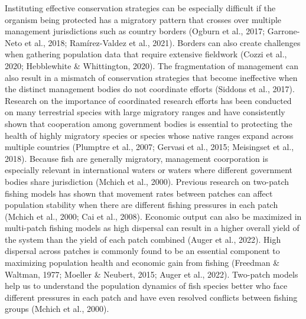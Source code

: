 \documentclass[
  12pt,
]{article}
\begin{document}
Instituting effective conservation strategies can be especially difficult if the organism being protected has a migratory pattern that crosses over multiple management jurisdictions such as country borders (Ogburn et al., 2017; Garrone-Neto et al., 2018; Ramírez-Valdez et al., 2021). Borders can also create challenges when gathering population data that require extensive fieldwork (Cozzi et al., 2020; Hebblewhite \& Whittington, 2020). The fragmentation of management can also result in a mismatch of conservation strategies that become ineffective when the distinct management bodies do not coordinate efforts (Siddons et al., 2017). Research on the importance of coordinated research efforts has been conducted on many terrestrial species with large migratory ranges and have consistently shown that cooperation among government bodies is essential to protecting the health of highly migratory species or species whose native ranges expand across multiple countries (Plumptre et al., 2007; Gervasi et al., 2015; Meisingset et al., 2018). Because fish are generally migratory, management coorporation is especially relevant in international waters or waters where different government bodies share jurisdiction (Mchich et al., 2000). Previous research on two-patch fishing models has shown that movement rates between patches can affect population stability when there are different fishing pressures in each patch (Mchich et al., 2000; Cai et al., 2008). Economic output can also be maximized in multi-patch fishing models as high dispersal can result in a higher overall yield of the system than the yield of each patch combined (Auger et al., 2022). High dispersal across patches is commonly found to be an essential component to maximizing population health and economic gain from fishing (Freedman \& Waltman, 1977; Moeller \& Neubert, 2015; Auger et al., 2022). Two-patch models help us to understand the population dynamics of fish species better who face different pressures in each patch and have even resolved conflicts between fishing groups (Mchich et al., 2000).
\end{document}
